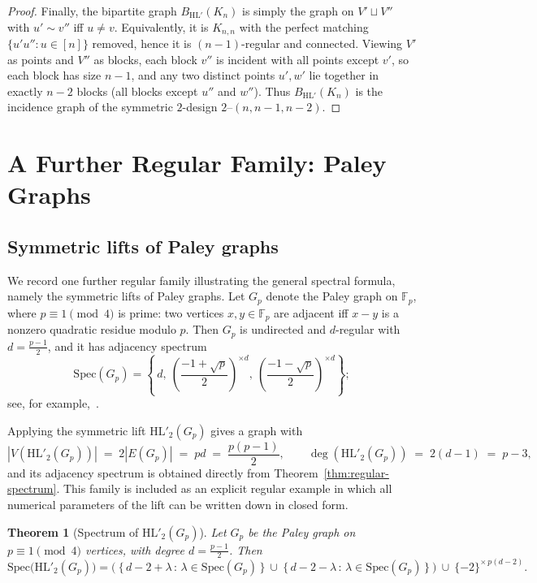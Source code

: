 \documentclass[11pt]{article}
\newcommand{\Spec}{\mathrm{Spec}}
\newtheorem{theorem}{Theorem}
\newcommand{\HL}{\mathrm{HL}}
\theoremstyle{plain}
\begin{document}
\begin{proof}
Finally, the bipartite graph $B_{\HL'}(K_n)$ is simply the graph on $V'\sqcup V''$ with
$u'\sim v''$ iff $u\ne v$. Equivalently, it is $K_{n,n}$ with the perfect matching
$\{u'u'':u\in[n]\}$ removed, hence it is $(n-1)$-regular and connected.
Viewing $V'$ as points and $V''$ as blocks, each block $v''$ is incident with all points
except $v'$, so each block has size $n-1$, and any two distinct points $u',w'$ lie
together in exactly $n-2$ blocks (all blocks except $u''$ and $w''$). Thus $B_{\HL'}(K_n)$
is the incidence graph of the symmetric $2$-design $2\text{--}(n,n-1,n-2)$.
\end{proof}


\section{A Further Regular Family: Paley Graphs}\label{sec:paley}

\subsection{Symmetric lifts of Paley graphs}\label{subsec:paley-theory}

We record one further regular family illustrating the general spectral formula, namely the
symmetric lifts of Paley graphs. Let \(G_p\) denote the Paley graph on \(\mathbb{F}_p\), where
\(p\equiv 1 \pmod 4\) is prime: two vertices \(x,y\in\mathbb{F}_p\) are adjacent iff \(x-y\) is a
nonzero quadratic residue modulo \(p\). Then \(G_p\) is undirected and \(d\)-regular with
\(d=\frac{p-1}{2}\), and it has adjacency spectrum
\[
\Spec(G_p)=\left\{\, d,\ \left(\frac{-1+\sqrt p}{2}\right)^{\times d},\ \left(\frac{-1-\sqrt p}{2}\right)^{\times d}\right\};
\]
see, for example,~\cite{godsil2001algebraic,paley1933,brouwer2011spectra}.

Applying the symmetric lift \( \HL'_2(G_p) \) gives a graph with
\[
|V(\HL'_2(G_p))| \;=\; 2|E(G_p)| \;=\; p d \;=\; \frac{p(p-1)}{2},
\qquad
\deg(\HL'_2(G_p)) \;=\; 2(d-1) \;=\; p-3,
\]
and its adjacency spectrum is obtained directly from Theorem~\ref{thm:regular-spectrum}. This family is
included as an explicit regular example in which all numerical parameters of the lift can be written down
in closed form.

\begin{theorem}[Spectrum of \(\HL'_2(G_p)\)]\label{thm:paley-lift-spectrum}
Let \(G_p\) be the Paley graph on \(p\equiv 1\pmod 4\) vertices, with degree \(d=\frac{p-1}{2}\).
Then
\[
\Spec\!\big(\HL'_2(G_p)\big)
=
\Big(\ \{\, d-2+\lambda \,:\, \lambda\in\Spec(G_p)\,\}\ \cup\ \{\, d-2-\lambda \,:\, \lambda\in\Spec(G_p)\,\}\ \Big)
\ \cup\ \{-2\}^{\times\,p(d-2)}.
\]
\end{theorem}
\end{document}
